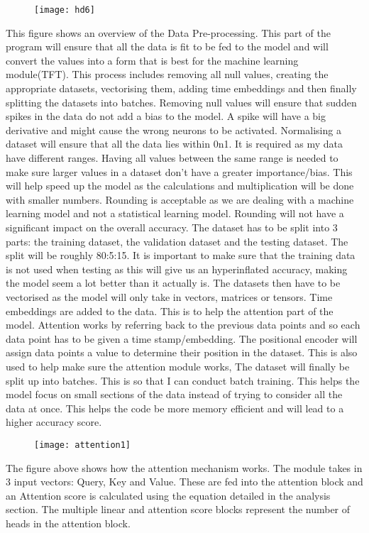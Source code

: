 \documentclass{article}
\begin{document}
\clearpage
\begin{figure}[H]
    \centering
    \texttt{[image: hd6]}
    \caption{}
\end{figure}
This figure shows an overview of the Data Pre-processing. This part of the program will ensure that all the data is fit to be fed to the model and will convert the values into a form that is best for the machine learning module(TFT). This process includes removing all null values, creating the appropriate datasets, vectorising them, adding time embeddings and then finally splitting the datasets into batches.
Removing null values will ensure that sudden spikes in the data do not add a bias to the model. A spike will have a big derivative and might cause the wrong neurons to be activated.
Normalising a dataset will ensure that all the data lies within 0n1. It is required as my data have different ranges. Having all values between the same range is needed to make sure larger values in a dataset don't have a greater importance/bias. This will help speed up the model as the calculations and multiplication will be done with smaller numbers. Rounding is acceptable as we are dealing with a machine learning model and not a statistical learning model. Rounding will not have a significant impact on the overall accuracy.
The dataset has to be split into 3 parts: the training dataset, the validation dataset and the testing dataset. The split will be roughly 80:5:15. It is important to make sure that the training data is not used when testing as this will give us an hyperinflated accuracy, making the model seem a lot better than it actually is.
The datasets then have to be vectorised as the model will only take in vectors, matrices or tensors.
Time embeddings are added to the data. This is to help the attention part of the model. Attention works by referring back to the previous data points and so each data point has to be given a time stamp/embedding.
The positional encoder will assign data points a value to determine their position in the dataset. This is also used to help make sure the attention module works,
The dataset will finally be split up into batches. This is so that I can conduct batch training. This helps the model focus on small sections of the data instead of trying to consider all the data at once. This helps the code be more memory efficient and will lead to a higher accuracy score.

\begin{figure}[H]
    \centering
    \texttt{[image: attention1]}
    \caption{}
\end{figure}
The figure above shows how the attention mechanism works. The module takes in 3 input vectors: Query, Key and Value. These are fed into the attention block and an Attention score is calculated using the equation detailed in the analysis section. The multiple linear and attention score blocks represent the number of heads in the attention block.
\end{document}
